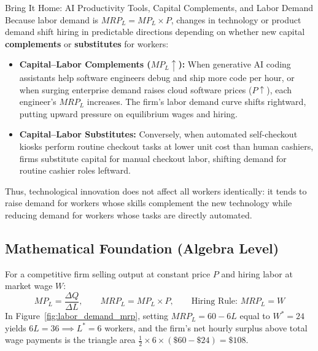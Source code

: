 \documentclass[11pt,letterpaper]{article}
\begin{document}
\begin{examplecase}{Bring It Home: AI Productivity Tools, Capital Complements, and Labor Demand}
Because labor demand is $MRP_L = MP_L \times P$, changes in technology or product demand shift hiring in predictable directions depending on whether new capital \textbf{complements} or \textbf{substitutes} for workers:
\begin{itemize}
    \item \textbf{Capital--Labor Complements ($MP_L \uparrow$):} When generative AI coding assistants help software engineers debug and ship more code per hour, or when surging enterprise demand raises cloud software prices ($P \uparrow$), each engineer's $MRP_L$ increases. The firm's labor demand curve shifts rightward, putting upward pressure on equilibrium wages and hiring.
    \item \textbf{Capital--Labor Substitutes:} Conversely, when automated self-checkout kiosks perform routine checkout tasks at lower unit cost than human cashiers, firms substitute capital for manual checkout labor, shifting demand for routine cashier roles leftward.
\end{itemize}
Thus, technological innovation does not affect all workers identically: it tends to raise demand for workers whose skills complement the new technology while reducing demand for workers whose tasks are directly automated.
\end{examplecase}

\subsection*{Mathematical Foundation (Algebra Level)}
For a competitive firm selling output at constant price $P$ and hiring labor at market wage $W$:
\begin{equation}
MP_L = \frac{\Delta Q}{\Delta L}, \qquad MRP_L = MP_L \times P, \qquad \text{Hiring Rule: } MRP_L = W
\end{equation}
In Figure~\ref{fig:labor_demand_mrp}, setting $MRP_L = 60 - 6L$ equal to $W^* = 24$ yields $6L = 36 \implies L^* = 6$ workers, and the firm's net hourly surplus above total wage payments is the triangle area $\frac{1}{2} \times 6 \times (\$60 - \$24) = \$108$.
\end{document}

